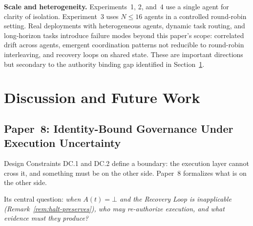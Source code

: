 \documentclass[11pt]{article}
\begin{document}
\textbf{Scale and heterogeneity.}
Experiments~1, 2, and~4 use a single agent for clarity of isolation.
Experiment~3 uses $N \leq 16$ agents in a controlled round-robin setting.
Real deployments with heterogeneous agents, dynamic task routing,
and long-horizon tasks introduce failure modes beyond this paper's scope:
correlated drift across agents, emergent coordination patterns not
reducible to round-robin interleaving, and recovery loops on shared state.
These are important directions but secondary to the authority binding gap
identified in Section~\ref{sec:discussion}.

\section{Discussion and Future Work}
\label{sec:discussion}

\subsection*{Paper~8: Identity-Bound Governance Under Execution Uncertainty}
\label{sec:p8-scope}

Design Constraints DC.1 and DC.2 define a boundary: the execution layer
cannot cross it, and something must be on the other side.
Paper~8 formalizes what is on the other side.

Its central question: \emph{when $A(t) = \bot$ and the Recovery Loop is
inapplicable (Remark~\ref{rem:halt-preserves}), who may re-authorize
execution, and what evidence must they produce?}
\end{document}
